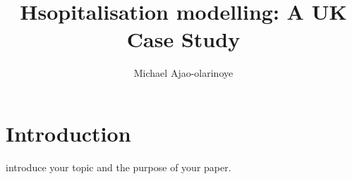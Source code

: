 \documentclass[lettersize, journal]{IEEEtran}
\begin{document}
\title{Hsopitalisation modelling: A UK Case Study}
\author{Michael Ajao-olarinoye}

\maketitle


\begin{abstract}

\end{abstract}

\begin{IEEEkeywords}

\end{IEEEkeywords}

\section{Introduction}
 introduce your topic and the purpose of your paper.


\printbibliography
\end{document}

